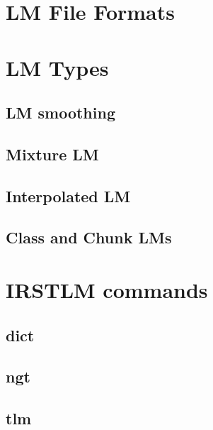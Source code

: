 \documentclass[11pt]{article}
\begin{document}
\newpage
\section{LM File Formats}
\label{sec:LMFileFormats}


\newpage
\section{LM Types}
\label{sec:LMTypes}

\subsection{LM smoothing}
\label{sec:LMSmoothing}


\subsection{Mixture LM}
\label{sec:mixtureLM}


\subsection{Interpolated LM}
\label{sec:InterpolatedLM}


\newpage
\subsection{Class and Chunk LMs}
\label{sec:ClassAndChunkLMs}


\newpage
\section{IRSTLM commands}
\label{sec:commands}

\subsection{dict}
\label{sec:dict}


\subsection{ngt}
\label{sec:ngt}


\subsection{tlm}
\label{sec:tlm}

\end{document}
